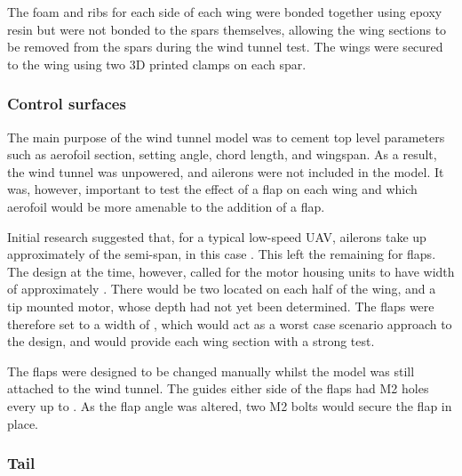 \documentclass[../../main.tex]{subfiles}
\begin{document}
The foam and ribs for each side of each wing were bonded together using epoxy resin but were not bonded to the spars themselves, allowing the wing sections to be removed from the spars during the wind tunnel test. 
The wings were secured to the wing using two 3D printed clamps on each spar. 


\subsubsection{Control surfaces} \label{sec:design-process:interim-design-review:wind-tunnel-test:control-surfaces}

The main purpose of the wind tunnel model was to cement top level parameters such as aerofoil section, setting angle, chord length, and wingspan.
As a result, the wind tunnel was unpowered, and ailerons were not included in the model.
It was, however, important to test the effect of a flap on each wing and which aerofoil would be more amenable to the addition of a flap. 

Initial research suggested that, for a typical low-speed UAV, ailerons take up approximately  of the semi-span, in this case  \cite{sadraey-13}.
This left the remaining  for flaps.
The design at the time, however, called for the motor housing units to have width of approximately .
There would be two located on each half of the wing, and a tip mounted motor, whose depth had not yet been determined.
The flaps were therefore set to a width of , which would act as a worst case scenario approach to the design, and would provide each wing section with a strong test.

The flaps were designed to be changed manually whilst the model was still attached to the wind tunnel.
The guides either side of the flaps had M2 holes every  up to .
As the flap angle was altered, two M2 bolts would secure the flap in place. 


\subsubsection{Tail} \label{sec:design-process:interim-design-review:wind-tunnel-test:tail}
\end{document}
